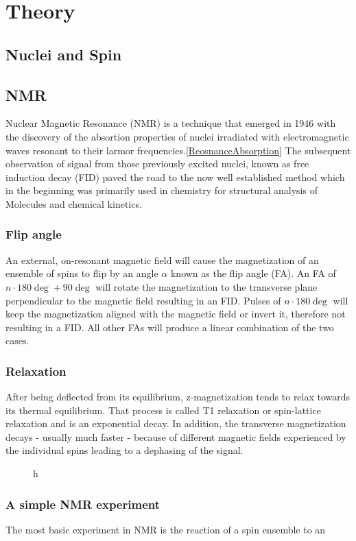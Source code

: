 \chapter{Theory}\label{chap:theory}
	\section{Nuclei and Spin}
	\section{NMR}
	Nuclear Magnetic Resonance (NMR) is a technique that emerged in 1946 with the discovery
	of the absortion properties of nuclei irradiated with electromagnetic waves resonant to their
	larmor frequencies.\ref{ReosnanceAbsorption} The subsequent observation of signal from those
	previously excited nuclei, known as free induction decay (FID) paved the road to the now well
	established method which in the beginning was primarily used in chemistry for structural
	analysis of Molecules and chemical kinetics.
		\subsection{Flip angle}
			An external, on-resonant magnetic field will cause the magnetization of an ensemble of
			spins to flip by an angle $\alpha$ known as the flip angle (FA). An FA of $n\cdot 180
			\deg + 90 \deg$ will rotate the magnetization to the transverse plane perpendicular to the magnetic field
			resulting in an FID. Pulses of $n\cdot 180 \deg$ will keep the magnetization aligned
			with the magnetic field or invert it, therefore not resulting in a FID. All other FAs
			will produce a linear combination of the two cases.
		\subsection{Relaxation}
			After being deflected from its equilibrium, z-magnetization tends to relax towards its
			thermal equilibrium. That process is called T1 relaxation or spin-lattice relaxation and
			is an exponential decay. In addition, the transverse magnetization decays - usually much
			faster - because of different magnetic fields experienced by the individual spins
			leading to a dephasing of the signal.
			\begin{figure}{h}
			\end{figure}
		\subsection{A simple NMR experiment}
			The most basic experiment in NMR is the reaction of a spin ensemble to an 
